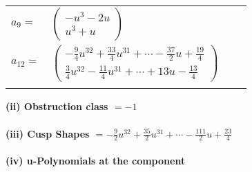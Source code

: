 \documentclass[1p]{elsarticle_modified}
\theoremstyle{definition}
\begin{document}
\begin{tabular}{m{7pt} m{180pt} m{7pt} m{180pt} }
\flushright $a_{9}=$&$\begin{pmatrix}- u^3-2 u\\u^3+u\end{pmatrix}$ \\
\flushright $a_{12}=$&$\begin{pmatrix}-\frac{9}{4} u^{32}+\frac{33}{4} u^{31}+\cdots-\frac{37}{2} u+\frac{19}{4}\\\frac{3}{4} u^{32}-\frac{11}{4} u^{31}+\cdots+13 u-\frac{13}{4}\end{pmatrix}$\\&\end{tabular}
\flushleft \textbf{(ii) Obstruction class $= -1$}\\~\\
\flushleft \textbf{(iii) Cusp Shapes $= -\frac{9}{2} u^{32}+\frac{35}{2} u^{31}+\cdots-\frac{111}{2} u+\frac{23}{4}$}\\~\\
\newpage\renewcommand{\arraystretch}{1}
\flushleft \textbf{(iv) u-Polynomials at the component}\newline \\
\end{document}

